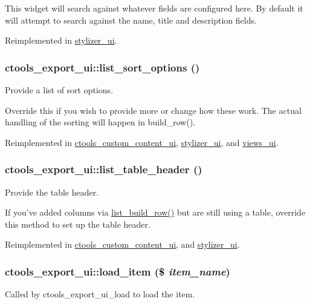 This widget will search against whatever fields are configured here. By default it will attempt to search against the name, title and description fields. 

Reimplemented in \hyperlink{classstylizer__ui_ab1ac0677e6a6faf8ec8174366e9097df}{stylizer\_\-ui}.\hypertarget{classctools__export__ui_ad9839b337e16e3c782eab7967550d3a1}{
\subsubsection[{list\_\-sort\_\-options}]{\setlength{\rightskip}{0pt plus 5cm}ctools\_\-export\_\-ui::list\_\-sort\_\-options ()}}
\label{classctools__export__ui_ad9839b337e16e3c782eab7967550d3a1}
Provide a list of sort options.

Override this if you wish to provide more or change how these work. The actual handling of the sorting will happen in build\_\-row(). 

Reimplemented in \hyperlink{classctools__custom__content__ui_acc4d7c6bc7a3f3f744882157ca6512c4}{ctools\_\-custom\_\-content\_\-ui}, \hyperlink{classstylizer__ui_a2460301e4fb1ae440fab788b72b1b472}{stylizer\_\-ui}, and \hyperlink{classviews__ui_a5f6a2333d7d780bf6760ce94bfe5d943}{views\_\-ui}.\hypertarget{classctools__export__ui_a01b1219535377db871132934f806b8a0}{
\subsubsection[{list\_\-table\_\-header}]{\setlength{\rightskip}{0pt plus 5cm}ctools\_\-export\_\-ui::list\_\-table\_\-header ()}}
\label{classctools__export__ui_a01b1219535377db871132934f806b8a0}
Provide the table header.

If you've added columns via \hyperlink{classctools__export__ui_ad72f3d7170f48e0d0cb1dacb2926bb78}{list\_\-build\_\-row()} but are still using a table, override this method to set up the table header. 

Reimplemented in \hyperlink{classctools__custom__content__ui_a26ea6386756947b59995763ff673e1aa}{ctools\_\-custom\_\-content\_\-ui}, and \hyperlink{classstylizer__ui_ac061b4df53f45a4832bcc133ba9b8d2d}{stylizer\_\-ui}.\hypertarget{classctools__export__ui_ab6ae2bbcbfa46949bd9fc14284bba061}{
\subsubsection[{load\_\-item}]{\setlength{\rightskip}{0pt plus 5cm}ctools\_\-export\_\-ui::load\_\-item (\$ {\em item\_\-name})}}
\label{classctools__export__ui_ab6ae2bbcbfa46949bd9fc14284bba061}
Called by ctools\_\-export\_\-ui\_\-load to load the item.

